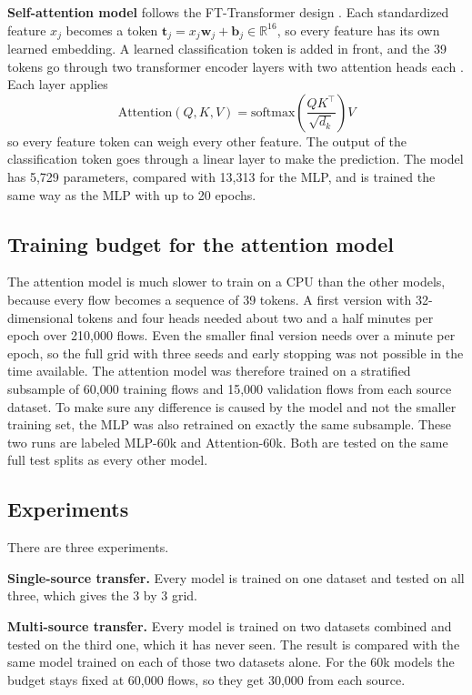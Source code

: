 \textbf{Self-attention model} follows the FT-Transformer design \cite{gorishniy2021}. Each standardized feature $x_j$ becomes a token $\mathbf{t}_j = x_j \mathbf{w}_j + \mathbf{b}_j \in \mathbb{R}^{16}$, so every feature has its own learned embedding. A learned classification token is added in front, and the 39 tokens go through two transformer encoder layers with two attention heads each \cite{vaswani2017}. Each layer applies
\begin{equation}
\mathrm{Attention}(Q, K, V) = \mathrm{softmax}\left(\frac{QK^\top}{\sqrt{d_k}}\right)V
\end{equation}
so every feature token can weigh every other feature. The output of the classification token goes through a linear layer to make the prediction. The model has 5,729 parameters, compared with 13,313 for the MLP, and is trained the same way as the MLP with up to 20 epochs.

\subsection{Training budget for the attention model}

The attention model is much slower to train on a CPU than the other models, because every flow becomes a sequence of 39 tokens. A first version with 32-dimensional tokens and four heads needed about two and a half minutes per epoch over 210,000 flows. Even the smaller final version needs over a minute per epoch, so the full grid with three seeds and early stopping was not possible in the time available. The attention model was therefore trained on a stratified subsample of 60,000 training flows and 15,000 validation flows from each source dataset. To make sure any difference is caused by the model and not the smaller training set, the MLP was also retrained on exactly the same subsample. These two runs are labeled MLP-60k and Attention-60k. Both are tested on the same full test splits as every other model.

\subsection{Experiments}

There are three experiments.

\textbf{Single-source transfer.} Every model is trained on one dataset and tested on all three, which gives the 3 by 3 grid.

\textbf{Multi-source transfer.} Every model is trained on two datasets combined and tested on the third one, which it has never seen. The result is compared with the same model trained on each of those two datasets alone. For the 60k models the budget stays fixed at 60,000 flows, so they get 30,000 from each source.

